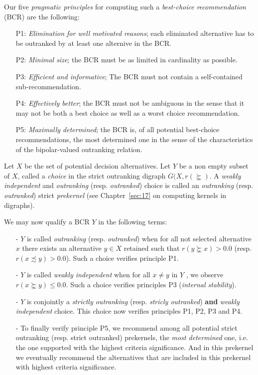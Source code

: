 Our five \emph{pragmatic principles} for computing such a \emph{best-choice recommendation} (BCR) are the following:
\begin{itemize}[leftmargin=1cm,listparindent=0em]
\item [P1:] \emph{Elimination for well motivated reasons}; each eliminated alternative has to be outranked by at least one alternive in the BCR.
\item [P2:] \emph{Minimal size}; the BCR must be as limited in cardinality as possible.
\item [P3:] \emph{Efficient and informative}; The BCR must not contain a self-contained sub-recommendation.
\item [P4:] \emph{Effectively better}; the BCR must not be ambiguous in the sense that it may not be both a best choice as well as a worst choice recommendation.
\item [P5:] \emph{Maximally determined}; the BCR is, of all potential best-choice recommendations, the most determined one in the sense of the characteristics of the bipolar-valued outranking relation.
\end{itemize}

Let $X$ be the set of potential decision alternatives. Let $Y$ be a non empty subset of $X$, called a \emph{choice} in the strict outranking digraph $G(X,r(\succnsim )$. A \emph{weakly independent} and \emph{outranking} (resp. \emph{outranked}) choice is called an \emph{outranking} (resp. \emph{outranked}) strict \emph{prekernel} (see Chapter~\vref{sec:17} on computing kernels in digraphs).

We may now qualify a BCR $Y$ in the following terms:

\begin{itemize}[leftmargin=0.5cm,listparindent=0em]
\item [-] $Y$ is called \emph{outranking} (resp. \emph{outranked}) when for all not selected alternative $x$ there exists an alternative $y \in X$ retained such that $r(y \succnsim x) > 0.0$ (resp. $r(x \precsim y) > 0.0$). Such a choice verifies principle P1.
\item [-] $Y$ is called \emph{weakly independent} when for all $x \neq y$ in $Y$ , we observe $r(x \succnsim y) \leq 0.0$. Such a choice verifies principles P3 (\emph{internal stability}).
\item [-] $Y$ is conjointly a \emph{strictly outranking} (resp. \emph{stricly outranked}) \textbf{and} \emph{weakly independent} choice. This choice now verifies principles P1, P2, P3 and P4.
\item [-] To finally verify principle P5, we recommend among all potential strict outranking (resp. strict outranked) prekernels, the \emph{most determined} one, i.e. the one supported with the highest criteria significance. And in this prekernel we eventually recommend the alternatives that are included in this prekernel with highest criteria significance.
\end{itemize}

